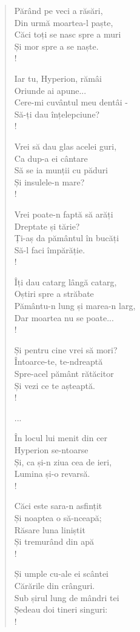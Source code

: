\documentclass{article}
\begin{document}
\begin{small}
\begin{multicols}{3}
\begin{verse}
Părând pe veci a răsări, \\
Din urmă moartea-l paște, \\
Căci toți se nasc spre a muri \\
Și mor spre a se naște. \\!

Iar tu, Hyperion, rămâi \\
Oriunde ai apune... \\
Cere-mi cuvântul meu dentâi - \\
Să-ți dau înțelepciune? \\!

Vrei să dau glas acelei guri, \\
Ca dup-a ei cântare \\
Să se ia munții cu păduri \\
Și insulele-n mare? \\!

Vrei poate-n faptă să arăți \\
Dreptate și tărie? \\
Ți-aș da pământul în bucăți \\
Să-l faci împărăție. \\!

Îți dau catarg lângă catarg, \\
Oștiri spre a străbate \\
Pământu-n lung și marea-n larg, \\
Dar moartea nu se poate... \\!

Și pentru cine vrei să mori? \\
Întoarce-te, te-ndreaptă \\
Spre-acel pământ rătăcitor \\
Și vezi ce te așteaptă. \\!

...

În locul lui menit din cer \\
Hyperion se-ntoarse \\
Și, ca și-n ziua cea de ieri, \\
Lumina și-o revarsă. \\!

Căci este sara-n asfințit \\
Și noaptea o să-nceapă; \\
Răsare luna liniștit \\
Și tremurând din apă \\!

Și umple cu-ale ei scântei \\
Cărările din crânguri. \\
Sub șirul lung de mândri tei \\
Ședeau doi tineri singuri: \\!


\end{verse}
\end{multicols}
\end{small}
\end{document}
